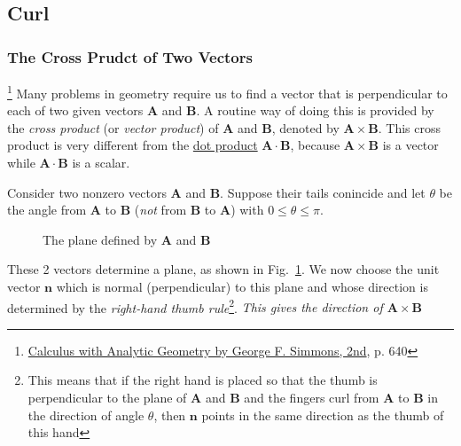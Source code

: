 \subsection{Curl}

\subsubsection{The Cross Prudct of Two Vectors}

\footnote{\href{https://trello.com/c/byu9Pyy8}{Calculus with Analytic Geometry by George F. Simmons, 2nd}, p. 640} Many
problems in geometry require us to find a vector that is perpendicular to each of two given vectors $\boldsymbol{A}$ and
$\boldsymbol{B}$. A routine way of doing this is provided by the \textit{cross product} (or \textit{vector product}) of
$\boldsymbol{A}$ and $\boldsymbol{B}$, denoted by $\boldsymbol{A} \times \boldsymbol{B}$. This cross product is very
different from the \hyperref[eq:divergence-dot-product]{dot product} $\boldsymbol{A} \cdot \boldsymbol{B}$, because
$\boldsymbol{A} \times \boldsymbol{B}$ is a vector while $\boldsymbol{A} \cdot \boldsymbol{B}$ is a scalar.

Consider two nonzero vectors $\boldsymbol{A}$ and $\boldsymbol{B}$. Suppose their tails conincide and let $\theta$ be
the angle from $\boldsymbol{A}$ to $\boldsymbol{B}$ (\textit{not} from $\boldsymbol{B}$ to $\boldsymbol{A}$) with
$0 \le \theta \le \pi$.

\begin{figure}[H]
    \centering
    \caption{The plane defined by $\boldsymbol{A}$ and $\boldsymbol{B}$}
    \label{fig:cross-prod}
\end{figure}

These 2 vectors determine a plane, as shown in Fig.~\ref{fig:cross-prod}. We now choose the unit
vector $\boldsymbol{n}$ which is normal (perpendicular) to this plane and whose direction is determined by the
\textit{right-hand thumb rule}\footnote{This means that if the right hand is placed so that the thumb is perpendicular
to the plane of $\boldsymbol{A}$ and $\boldsymbol{B}$ and the fingers curl from $\boldsymbol{A}$ to $\boldsymbol{B}$ in
the direction of angle $\theta$, then $\boldsymbol{n}$ points in the same direction as the thumb of this hand}.
\textit{This gives the direction of $\boldsymbol{A} \times \boldsymbol{B}$}

